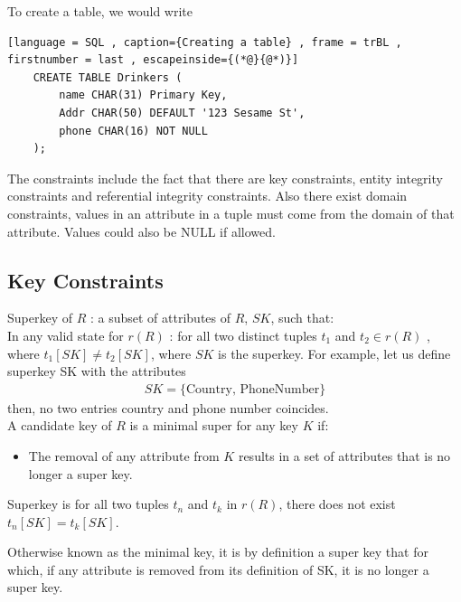 \documentclass[a4paper]{article}
\theoremstyle{plain}
\theoremstyle{definition}
\newtheorem{defn}{Definition}[section]
\theoremstyle{remark}
\begin{document}
	To create a table, we would write
	\begin{lstlisting}[language = SQL , caption={Creating a table} , frame = trBL , firstnumber = last , escapeinside={(*@}{@*)}]
	CREATE TABLE Drinkers (
		name CHAR(31) Primary Key,
		Addr CHAR(50) DEFAULT '123 Sesame St',
		phone CHAR(16) NOT NULL
	);
	\end{lstlisting}
	The constraints include the fact that there are key constraints, entity integrity constraints and referential integrity constraints. Also there exist domain constraints, values in an attribute in a tuple must come from the domain of that attribute. Values could also be NULL if allowed. 
	\subsection{Key Constraints}
	Superkey of $R$ : a subset of attributes of $R$, $SK$, such that: \\
	In any valid state for $r(R)$ : for all two distinct tuples $t_1$ and $t_2 \in r(R)$ , where $t_1[SK] \neq  t_2[SK]$, where $SK $ is the superkey. For example, let us define superkey SK with the attributes
	\begin{align*}
		SK = \{\text{Country, PhoneNumber}\}
	\end{align*}
	then, no two entries country and phone number coincides. \\
	A candidate key of $R$ is a minimal super for any key $K$ if:
	\begin{itemize}
		\item The removal of any attribute from $K$ results in a set of attributes that is no longer a super key.
	\end{itemize}
	\begin{tcolorbox}[colback=black!3!white,colframe=black!60!white,title=\begin{defn}Superkey \label{Superkey}\end{defn}]
	Superkey is for all two tuples $t_n$ and $t_k$ in $r(R)$, there does not exist $t_n[SK]=t_k[SK]$.
	\end{tcolorbox}
	\begin{tcolorbox}[colback=black!6!white,colframe=black!60!white,title=\begin{defn}Candidate Key \label{Candidate Key}\end{defn}]
	Otherwise known as the minimal key, it is by definition a super key that for which, if any attribute is removed from its definition of SK, it is no longer a super key.
	\end{tcolorbox}
\end{document}
